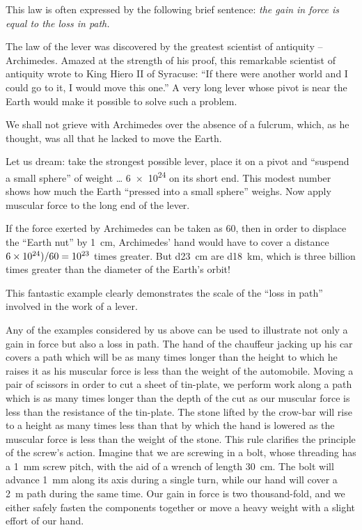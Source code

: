 This law is often expressed by the following brief sentence: \emph{the gain in force is equal to the loss in path.}

The law of the lever was discovered by the greatest scientist of antiquity -- Archimedes. Amazed at the strength of his proof, this remarkable scientist of antiquity wrote to King Hiero II of Syracuse: ``If there were another world and I could go to it, I would move this one.'' A very long lever whose pivot is near the Earth would make it possible to solve such a problem.

We shall not grieve with Archimedes over the absence of a fulcrum, which, as he thought, was all that he lacked to move the Earth.

Let us dream: take the strongest possible lever, place
it on a pivot and ``suspend a small sphere'' of weight \ldots{} \SI{6e24}{\kgf} on its short end. This modest number shows how much the Earth ``pressed into a small sphere'' weighs. Now apply muscular force to the long end of the lever.

If the force exerted by Archimedes can be taken as
\SI{60}{\kgf}, then in order to displace the ``Earth nut'' by \SI{1}{\centi\meter}, Archimedes' hand would have to cover a distance $\num{6e24})/60 = \num{d23}$ times greater. But \SI{d23}{\centi\meter} are \SI{d18}{\kilo\meter}, which is three billion times greater than the diameter of the Earth's orbit!

This fantastic example clearly demonstrates the scale of the ``loss in path'' involved in the work of a lever.

Any of the examples considered by us above can be used to illustrate not only a gain in force but also a loss
in path. The hand of the chauffeur jacking up his car covers a path which will be as many times longer than the
height to which he raises it as his muscular force is less than the weight of the automobile. Moving a pair of scissors in order to cut a sheet of tin-plate, we perform work along a path which is as many times longer than the depth of the cut as our muscular force is less than the resistance of the tin-plate. The stone lifted by the crow-bar will rise to a height as many times less than that by which the hand is lowered as the muscular force is less than the weight of the stone. This rule clarifies the principle of the
screw's action. Imagine that we are screwing in a bolt, whose threading has a \SI{1}{\milli\meter} screw pitch, with the aid of
a wrench of length \SI{30}{\centi\meter}. The bolt will advance \SI{1}{\milli\meter} along its axis during a single turn, while our hand will cover a \SI{2}{\meter} path during the same time. Our gain in force is two thousand-fold, and we either safely fasten the components together or move a heavy weight with a slight effort of our hand.



